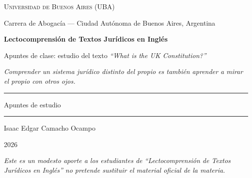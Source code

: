 \documentclass[12pt,oneside]{book}
\newcommand{\universidad}{Universidad de Buenos Aires (UBA)}
\newcommand{\carrera}{Carrera de Abogacía --- Ciudad Autónoma de Buenos Aires, Argentina}
\newcommand{\materia}{Lectocomprensión de Textos Jurídicos en Inglés}
\newcommand{\titulo}{Apuntes de clase: estudio del texto \emph{``What is the UK Constitution?''}}
\newcommand{\autor}{Isaac Edgar Camacho Ocampo}
\newcommand{\anio}{2026}
\begin{document}
\begin{titlepage}
\thispagestyle{empty}

\begin{center}

\vspace*{1cm}

{\large \textsc{\universidad}}

\vspace{0.2cm}

{\large \carrera}

\vspace{3cm}

{\Huge \textbf{\materia}}

\vspace{1cm}

{\LARGE \titulo}

\vspace{0.8cm}

\textit{Comprender un sistema jurídico distinto del propio es también aprender a mirar el propio con otros ojos.}

\vspace{1.2cm}

\rule{0.70\textwidth}{0.5pt}

\vspace{0.5cm}

{\large Apuntes de estudio}

\vspace{0.5cm}

\rule{0.70\textwidth}{0.5pt}

\vfill

{\large \autor}

\vspace{0.3cm}

{\large \anio}

\end{center}

\vfill

\begin{flushleft}
\textit{Este es un modesto aporte a los estudiantes de ``Lectocomprensión de Textos Jurídicos en Inglés'' no pretende sustituir el material oficial de la materia.}
\end{flushleft}

\end{titlepage}

\tableofcontents
\end{document}
